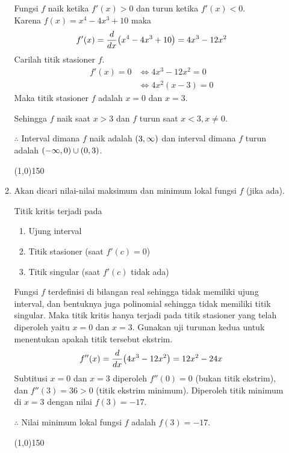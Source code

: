 \begin{enumerate}[leftmargin=*, label={\arabic*}.]
\begin{enumerate}[label={\alph*}.]
    Fungsi $f$ naik ketika $f'(x) > 0$ dan turun ketika $f'(x) < 0$.\\
    Karena $f(x)=x^{4}-4x^{3}+10$ maka
    \[
    f'(x) = \drv{x}{x^{4}-4x^{3}+10} = 4x^{3}-12x^{2}
    \]
    Carilah titik stasioner $f$.
    \begin{align*}
        f'(x)=0 &\iff 4x^{3}-12x^{2}=0\\
        &\iff 4x^{2}(x-3) = 0
    \end{align*}
    Maka titik stasioner $f$ adalah $x=0$ dan $x=3$.

    
    
    Sehingga $f$ naik saat $x > 3$ dan $f$ turun saat $x < 3, x\neq 0$.

    $\therefore$ Interval dimana $f$ naik adalah $(3, \infty)$ dan interval dimana 
    $f$ turun adalah $(-\infty,0)\cup(0,3)$.


\begin{center}\line(1,0){150}\end{center}


    \item Akan dicari nilai-nilai maksimum dan minimum lokal fungsi $f$ (jika ada).
    
    Titik kritis terjadi pada
        \begin{enumerate}[label={\arabic*})]
        \item Ujung interval
        \item Titik stasioner (saat $f'(c)=0$)
        \item Titik singular (saat $f'(c)$ tidak ada)
        \end{enumerate}
    Fungsi $f$ terdefinisi di bilangan real sehingga tidak memiliki ujung interval, dan bentuknya 
    juga polinomial sehingga tidak memiliki titik singular. Maka titik kritis hanya terjadi pada 
    titik stasioner yang telah diperoleh yaitu $x=0$ dan $x=3$. Gunakan uji turunan kedua 
    untuk menentukan apakah titik tersebut ekstrim.
    \[
        f''(x) = \drv{x}{4x^{3}-12x^{2}} = 12x^{2}-24x
    \]
    Subtitusi $x = 0$ dan $x = 3$ diperoleh $f''(0) = 0$ (bukan titik ekstrim), dan 
    $f''(3) = 36 > 0$ (titik ekstrim minimum). Diperoleh titik minimum di $x=3$ dengan nilai 
    $f(3) = -17$.

    $\therefore$ Nilai minimum lokal fungsi $f$ adalah $f(3)=-17$.


\begin{center}\line(1,0){150}\end{center}



\end{enumerate}
\end{enumerate}
